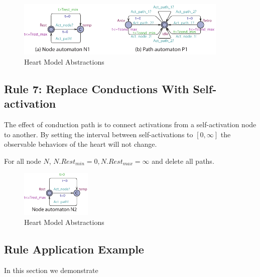 \begin{figure}[!h]
		\centering
		\includegraphics[width=0.9\textwidth]{figs/rule5.pdf}
		\caption{\small Heart Model Abstractions}
		\label{fig:rule5}
\end{figure}

\subsection{Rule 7: Replace Conductions With Self-activation}
The effect of conduction path is to connect activations from a self-activation node to another. By setting the interval between self-activations to $[0,\infty]$ the observable behaviors of the heart will not change.

For all node $N$, $N.Rest_{min}=0,N.Rest_{max}=\infty$ and delete all paths.
\begin{figure}[!h]
		\centering
		\includegraphics[width=0.3\textwidth]{figs/rule6.pdf}
		\caption{\small Heart Model Abstractions}
		\label{fig:rule6}
\end{figure}

\subsection{Rule Application Example}
In this section we demonstrate 

